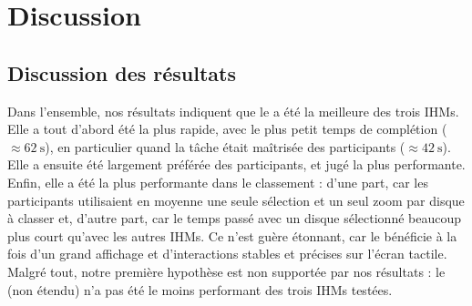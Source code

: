 \chapter{Discussion}
\label{ch:discussion}

\section{Discussion des résultats}
\label{sec:discussion_results}

Dans l'ensemble, nos résultats indiquent que le  a été la meilleure des trois IHMs. Elle a tout d'abord été la plus rapide, avec le plus petit temps de complétion ($\approx \SI{62}{\s}$), en particulier quand la tâche était maîtrisée des participants ($\approx \SI{42}{\s}$). Elle a ensuite été largement préférée des participants, et jugé la plus performante. Enfin, elle a été la plus performante dans le classement : d'une part, car les participants utilisaient en moyenne une seule sélection et un seul zoom par disque à classer et, d'autre part, car le temps passé avec un disque sélectionné beaucoup plus court qu'avec les autres IHMs. Ce n'est guère étonnant, car le  bénéficie à la fois d'un grand affichage et d'interactions stables et précises sur l'écran tactile. Malgré tout, notre première hypothèse est non supportée par nos résultats : le  (non étendu) n'a pas été le moins performant des trois IHMs testées.


